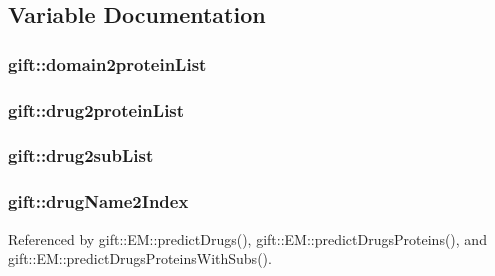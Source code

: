 \subsection{Variable Documentation}
\subsubsection[{\texorpdfstring{domain2protein\+List}{domain2proteinList}}]{ gift\+::domain2protein\+List}\hypertarget{namespacegift_ac99bcb1b736637f97e82be7503c725b5}{}\label{namespacegift_ac99bcb1b736637f97e82be7503c725b5}
\subsubsection[{\texorpdfstring{drug2protein\+List}{drug2proteinList}}]{ gift\+::drug2protein\+List}\hypertarget{namespacegift_a2c0005015565d7432dd64fd6bafd3395}{}\label{namespacegift_a2c0005015565d7432dd64fd6bafd3395}
\subsubsection[{\texorpdfstring{drug2sub\+List}{drug2subList}}]{ gift\+::drug2sub\+List}\hypertarget{namespacegift_a73506f6b6bc3e6f6fedfacf8bf0d38f1}{}\label{namespacegift_a73506f6b6bc3e6f6fedfacf8bf0d38f1}
\subsubsection[{\texorpdfstring{drug\+Name2\+Index}{drugName2Index}}]{ gift\+::drug\+Name2\+Index}\hypertarget{namespacegift_a3385bc2f0aa26289e7f7d69635207e5d}{}\label{namespacegift_a3385bc2f0aa26289e7f7d69635207e5d}


Referenced by gift\+::\+E\+M\+::predict\+Drugs(), gift\+::\+E\+M\+::predict\+Drugs\+Proteins(), and gift\+::\+E\+M\+::predict\+Drugs\+Proteins\+With\+Subs().

